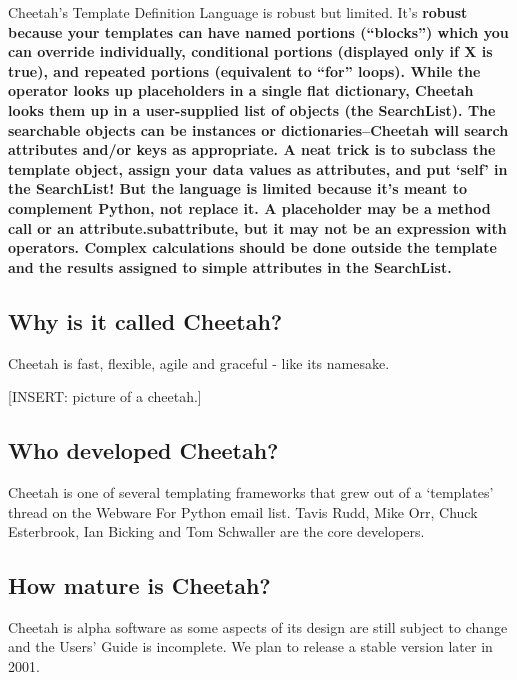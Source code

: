 Cheetah's Template Definition Language is robust but limited.  It's
\bf{robust} because your templates can have named portions (``blocks'') which
you can override individually, conditional portions (displayed only if X is
true), and repeated portions (equivalent to ``for'' loops).  While the
\code{\%} operator looks up placeholders in a single flat dictionary, Cheetah
looks them up in a user-supplied list of objects (the SearchList).  The
searchable objects can be instances or dictionaries--Cheetah will search
attributes and/or keys as appropriate.  A neat trick is to subclass the
template object, assign your data values as attributes, and put `self' in the
SearchList!  But the language is \bf{limited} because it's meant to complement
Python, not replace it.  A placeholder may be a method call or an
attribute.subattribute, but it may not be an expression with operators.
Complex calculations should be done outside the template and the results
assigned to simple attributes in the SearchList.



\subsection{Why is it called Cheetah?}
\label{intro.name}

Cheetah is fast, flexible, agile and graceful - like its namesake. 

[INSERT: picture of a cheetah.]


\subsection{Who developed Cheetah?}
\label{intro.developers}

Cheetah is one of several templating frameworks that grew out of a `templates'
thread on the Webware For Python email list.  Tavis Rudd, Mike Orr, Chuck
Esterbrook, Ian Bicking and Tom Schwaller are the core developers.

\subsection{How mature is Cheetah?}
\label{intro.mature}

Cheetah is alpha software as some aspects of its design are
still subject to change and the Users' Guide is incomplete.
We plan to release a stable version later in 2001.




